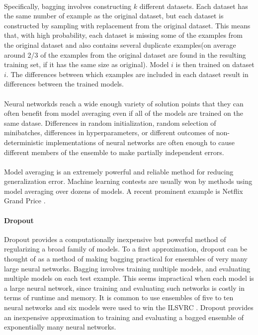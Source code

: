 \paragraph{}
Specifically, bagging involves constructing $k$ different datasets.
Each dataset has the same number of example as the original dataset, but each dataset is constructed by sampling with replacement from the original dataset.
This means that, with high probability, each dataset is missing some of the examples from the original dataset and also contains several duplicate examples(on average around 2/3 of the examples from the original dataset are found in the resulting training set, if it has the same size as original).
Model $i$ is then trained on dataset $i$.
The differences between which examples are included in each dataset result in differences between the trained models.
\paragraph{}
Neural networkds reach a wide enough variety of solution points that they can often benefit from model averaging even if all of the models are trained on the same datase.
Differences in random initialization, random selection of minibatches, differences in hyperparameters, or different outcomes of non-deterministic implementations of neural networks are often enough to cause different members of the ensemble to make partially independent errors.
\paragraph{}
Model averaging is an extremely powerful and reliable method for reducing generalization error.
Machine learning contests are usually won by methods using model averaging over dozens of models.
A recent prominent example is Netflix Grand Price \cite{koren2009}.

\paragraph{Dropout}
Dropout \cite{JMLR:v15:srivastava14a} provides a computationally inexpensive but powerful method of regularizing a broad family of models.
To a first approximation, dropout can be thought of as a method of making bagging practical for ensembles of very many large neural networks.
Bagging involves training multiple models, and evaluating multiple models on each test example.
This seems impractical when each model is a large neural network, since training and evaluating such networks is costly in terms of runtime and memory.
It is common to use ensembles of five to ten neural networks and six models were used to win the ILSVRC \cite{DBLP:journals/corr/SzegedyLJSRAEVR14}.
Dropout provides an inexpensive approximation to training and evaluating a bagged ensemble of exponentially many neural networks.
